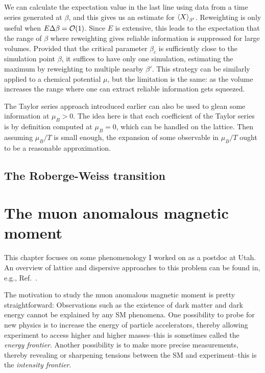 We can calculate the expectation value in the last line
using data from a time series generated at $\beta$, and this gives us an
estimate for $\ev{X}_{\beta'}$. Reweighting is only useful when
$E\Delta\beta=\order{1}$. Since $E$ is extensive, this leads to the
expectation that the range of $\beta$ where reweighting gives reliable
information is suppressed for large volumes. 
Provided that the critical parameter $\beta_c$
is sufficiently close to the simulation point $\beta$, it suffices
to have only one simulation, estimating the maximum by reweighting to
multiple nearby $\beta'$. This strategy can be similarly applied
to a chemical potential $\mu$, but the limitation is the same: as
the volume increases the range where one can extract reliable
information gets squeezed.

The Taylor series approach introduced earlier can also be used to
glean some information at $\mu_B>0$. The idea here is that each
coefficient of the Taylor series is by definition computed at
$\mu_B=0$, which can be handled on the lattice. Then assuming
$\mu_B/T$ is small enough, the expansion of some observable in
$\mu_B/T$ ought to be a reasonable approximation.

\subsection{The Roberge-Weiss transition}\label{sec:RW}



\section{The muon anomalous magnetic moment}\label{sec:muonAnom}

This chapter focuses on some phenomenology I worked on as a postdoc at Utah.
An overview of lattice and dispersive approaches to this problem can
be found in, e.g., Ref.~\cite{aoyama_anomalous_2020}.

The motivation to study the muon anomalous magnetic moment is pretty
straightforward: Observations such as the existence of dark matter and
dark energy cannot be explained by any SM phenomena. One possibility to probe
for new physics is to increase the energy of particle accelerators, thereby
allowing experiment to access higher and higher masses--this is sometimes
called the {\it energy frontier}.
Another possibility is to make more precise measurements, thereby revealing or
sharpening tensions between the SM and experiment--this is
the {\it intensity frontier}.

